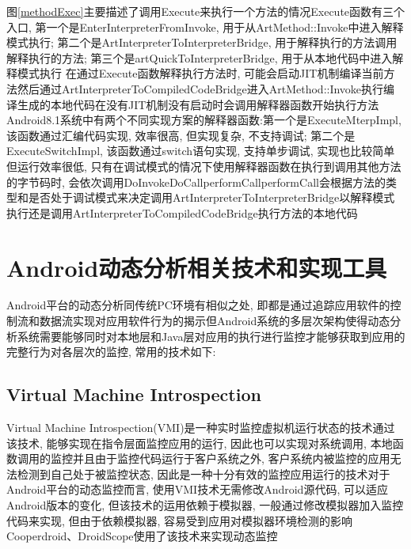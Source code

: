 图\ref{methodExec}主要描述了调用Execute来执行一个方法的情况\juhao Execute函数有三个入口, 第一个是EnterInterpreterFromInvoke, 用于从ArtMethod::Invoke中进入解释模式执行; 第二个是ArtInterpreterToInterpreterBridge, 用于解释执行的方法调用解释执行的方法; 第三个是artQuickToInterpreterBridge, 用于从本地代码中进入解释模式执行\juhao
在通过Execute函数解释执行方法时, 可能会启动JIT机制编译当前方法然后通过ArtInterpreterToCompiledCodeBridge进入ArtMethod::Invoke执行编译生成的本地代码\juhao 在没有JIT机制没有启动时会调用解释器函数开始执行方法\juhao Android8.1系统中有两个不同实现方案的解释器函数:第一个是ExecuteMterpImpl, 该函数通过汇编代码实现, 效率很高, 但实现复杂, 不支持调试; 第二个是ExecuteSwitchImpl, 该函数通过switch语句实现, 支持单步调试, 实现也比较简单但运行效率很低, 只有在调试模式的情况下使用\juhao 解释器函数在执行到调用其他方法的字节码时, 会依次调用DoInvoke\dunhao DoCall\dunhao performCall\juhao performCall会根据方法的类型和是否处于调试模式来决定调用ArtInterpreterToInterpreterBridge以解释模式执行还是调用ArtInterpreterToCompiledCodeBridge执行方法的本地代码\juhao 


\section{Android动态分析相关技术和实现工具}
Android平台的动态分析同传统PC环境有相似之处, 即都是通过追踪应用软件的控制流和数据流实现对应用软件行为的揭示\juhao 但Android系统的多层次架构使得动态分析系统需要能够同时对本地层和Java层对应用的执行进行监控才能够获取到应用的完整行为\juhao 对各层次的监控, 常用的技术如下:

\subsection{Virtual Machine Introspection}
Virtual Machine Introspection(VMI)是一种实时监控虚拟机运行状态的技术\juhao 通过该技术, 能够实现在指令层面监控应用的运行, 因此也可以实现对系统调用, 本地函数调用的监控\juhao 并且由于监控代码运行于客户系统之外, 客户系统内被监控的应用无法检测到自己处于被监控状态, 因此是一种十分有效的监控应用运行的技术\juhao 对于Android平台的动态监控而言, 使用VMI技术无需修改Android源代码, 可以适应Android版本的变化, 但该技术的运用依赖于模拟器, 一般通过修改模拟器加入监控代码来实现, 但由于依赖模拟器, 容易受到应用对模拟器环境检测的影响\juhao Cooperdroid、DroidScope使用了该技术来实现动态监控\juhao

